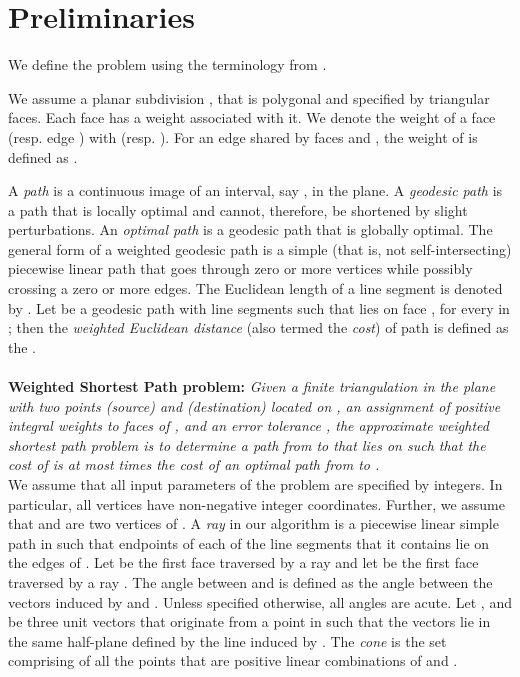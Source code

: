 \documentclass[11pt]{article}
\begin{document}
\section{Preliminaries}
\label{sect:prelim}

We define the problem using the terminology from \cite{journals/jacm/MitchellP91}.

We assume a planar subdivision , that is polygonal and specified by triangular faces.
Each face  has a weight  associated with it. 
We denote the weight of a face  (resp. edge ) with  (resp. ).
For an edge  shared by faces  and , the weight of  is defined as .

A {\it path} is a continuous image of an interval, say , in the plane.
A {\it geodesic path} is a path that is locally optimal and cannot, therefore, be shortened by slight perturbations.
An {\it optimal path} is a geodesic path that is globally optimal.
The general form of a weighted geodesic path is a simple (that is, not self-intersecting) piecewise linear path that goes through zero or more vertices while possibly crossing a zero or more edges.
The Euclidean length of a line segment  is denoted by .
Let  be a geodesic path with line segments  such that  lies on face , for every  in ; then the {\it weighted Euclidean distance} (also termed the {\it cost}) of path  is defined as the .\\ \\
{\bf Weighted Shortest Path problem:}
{\em Given a finite triangulation  in the plane with two points  (source) and  (destination) located on , an assignment of positive integral weights to faces of , and an error tolerance , the {\it approximate weighted shortest path} problem is to determine a path  from  to  that lies on  such that the cost of  is at most  times the cost of an optimal path from  to .}\\

We assume that all input parameters of the problem are specified by integers.
In particular, all vertices have non-negative integer coordinates.
Further, we assume that  and  are two vertices of .
A {\it ray} in our algorithm is a piecewise linear simple path in  such that endpoints of each of the line segments that it contains lie on the edges of .
Let  be the first face traversed by a ray  and let  be the first face traversed by a ray .
The angle between  and  is defined as the angle between the vectors induced by  and .
Unless specified otherwise, all angles are acute.
Let ,  and  be three unit vectors that originate from a point  in  such that the vectors  lie in the same half-plane defined by the line induced by .
The {\it cone}  is the set comprising of all the points that are positive linear combinations of  and .
\end{document}

